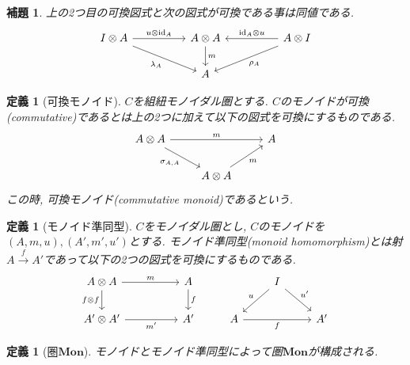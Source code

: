 \documentclass[a4paper,12pt]{ltjsarticle}
\theoremstyle{break}
\newtheorem{defn}[thm]{定義}
\newtheorem{lem}[thm]{補題}
\newcommand{\mon}{\mathbf{Mon}}
\newcommand{\xr}[1]{\xrightarrow{#1}}
\newcommand{\id}{\mathrm{id}}
\newcommand{\la}{\lambda}
\newcommand{\si}{\sigma}
\newcommand{\ot}{\otimes}
\numberwithin{equation}{section}
\begin{document}
\begin{lem} 
  上の2つ目の可換図式と次の図式が可換である事は同値である.
  \[\begin{tikzcd}
    {I \ot A} && {A \ot A} && {A \ot I} \\
    && A
    \arrow["{\id_A \ot u}"', from=1-5, to=1-3]
    \arrow["{u \ot \id_A}", from=1-1, to=1-3]
    \arrow["m", from=1-3, to=2-3]
    \arrow["{\rho_A}", from=1-5, to=2-3]
    \arrow["{\la_A}"', from=1-1, to=2-3]
  \end{tikzcd}\]
\end{lem}

\begin{defn}[可換モノイド]
  $C$を組紐モノイダル圏とする. 
  $C$のモノイドが可換(commutative)であるとは上の2つに加えて以下の図式を可換にするものである. 
  \[\begin{tikzcd}
    {A \ot A} && A \\
    & {A \ot A}
    \arrow["m", from=1-1, to=1-3]
    \arrow["{\si_{A,A}}"', from=1-1, to=2-2]
    \arrow["m"', from=2-2, to=1-3]
  \end{tikzcd}\]
  この時, 可換モノイド(commutative monoid)であるという. 
\end{defn}

\begin{defn}[モノイド準同型]
  $C$をモノイダル圏とし, $C$のモノイドを$(A,m,u), (A',m',u')$とする. 
  モノイド準同型(monoid homomorphism)とは射$A \xr{f} A'$であって以下の2つの図式を可換にするものである. 
  \[\begin{tikzcd}
    {A \ot A} && A && I \\
    {A' \ot A'} && {A'} & A && {A'}
    \arrow["m", from=1-1, to=1-3]
    \arrow["f", from=1-3, to=2-3]
    \arrow["{f \ot f}"', from=1-1, to=2-1]
    \arrow["{m'}"', from=2-1, to=2-3]
    \arrow["u"', from=1-5, to=2-4]
    \arrow["f"', from=2-4, to=2-6]
    \arrow["{u'}", from=1-5, to=2-6]
  \end{tikzcd}\]
\end{defn}

\begin{defn}[圏$\mon$]
  モノイドとモノイド準同型によって圏$\mon$が構成される. 
\end{defn}
\end{document}
